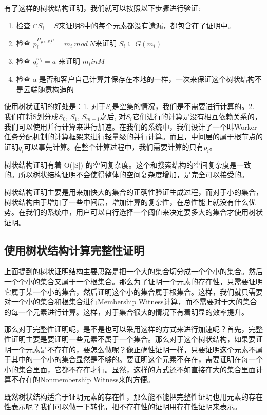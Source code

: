 有了这样的树状结构证明，我们就可以按照以下步骤进行验证:
\begin{enumerate}
  \item 检查 $\cap S_i = S$来证明S中的每个元素都没有遗漏，都包含在了证明中。
  \item 检查 $p_i^{\Pi_{\mu \in S_i} \mu} = m_i\ mod\ N$来证明 $S_i \subseteq G(m_i)$
  \item 检查 $q_i^{m_i} = a$ 来证明 $m_i in M$
  \item 检查 a 是否和客户自己计算并保存在本地的一样，一次来保证这个树状结构不是云端随意构造的
\end{enumerate}

使用树状证明的好处是：1. 对于$S_i$是空集的情况，我们是不需要进行计算的。2. 我们在将S划分成$S_0$, $S_1$, $S_{m-1}$之后, 对$S_i$它们进行的计算是没有相互依赖关系的，我们可以使用并行计算来进行加速。在我们的系统中，我们设计了一个叫Worker任务分配机制的计算框架来进行轻量级的并行计算。而且，中间层的属于根节点的证明$q_i$可以事先计算。在整个计算过程中，我们需要计算的只有$p_i$。

树状结构证明有着 O(|S|) 的空间复杂度。这个和搜索结构的空间复杂度是一致的。所以树状结构证明不会使得整体的空间复杂度增加，是完全可以接受的。

树状结构证明主要是用来加快大的集合的正确性验证生成过程，而对于小的集合，树状结构由于增加了一些中间层，增加计算的复杂性，在总性能上就没有什么优势。在我们的系统中，用户可以自行选择一个阈值来决定要多大的集合才使用树状证明。

\subsection{使用树状结构计算完整性证明}
上面提到的树状证明结构主要思路是把一个大的集合切分成一个个小的集合。然后一个个小的集合又属于一个根集合。那么为了证明一个元素的存在性，只需要证明它属于某一个小的集合，然后证明这个小的集合属于根集合。这样，我们就只需要对一个小的集合和根集合进行Membership Witness计算，而不需要对于大的集合的每一个元素进行计算。这样，对于集合很大的情况下有着明显的效率提升。

那么对于完整性证明呢，是不是也可以采用这样的方式来进行加速呢？首先，完整性证明主要是要证明一些元素不属于一个集合。那么对于这个树状结构，如果要证明一个元素是不存在的，要怎么做呢？像正确性证明一样，只要证明这个元素不属于其中的一个小的集合显然是不够的。要证明这个元素不存在，需要证明在每一个小的集合里面，它都不存在才行。显然，这样的方式还不如直接在大的集合里面计算不存在的Nonmembership Witness来的方便。

既然树状结构适合于证明元素的存在性，那么能不能把完整性证明也用元素的存在性表示呢？我们可以做一下转化，把不存在性的证明用存在性证明来表示。

